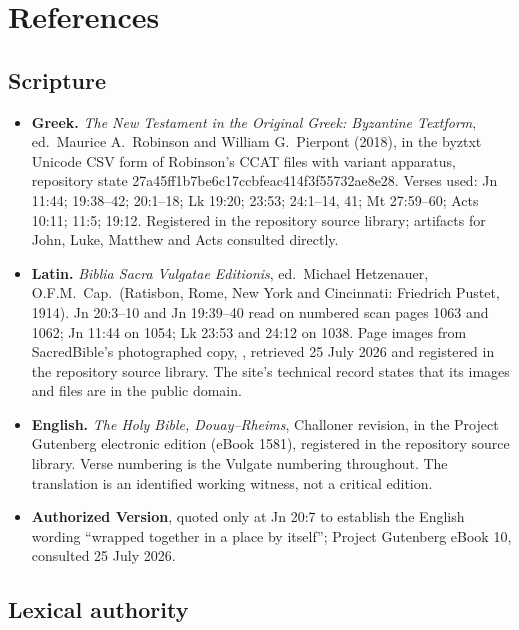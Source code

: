 \section{References}

\begingroup
\sloppy

\subsection*{Scripture}

{\fontsize{8.6}{9.6}\selectfont
\begin{itemize}[itemsep=0pt,parsep=0pt,topsep=0.05em]
\item \textbf{Greek.} \emph{The New Testament in the Original Greek: Byzantine
Textform}, ed.\ Maurice A.\ Robinson and William G.\ Pierpont (2018), in the
byztxt Unicode CSV form of Robinson's CCAT files with variant apparatus,
repository state 27a45ff1b7be6c17ccbfeac414f3f55732ae8e28. Verses used: Jn
11:44; 19:38--42; 20:1--18; Lk 19:20; 23:53; 24:1--14, 41; Mt 27:59--60; Acts
10:11; 11:5; 19:12. Registered in the repository source library; artifacts for
John, Luke, Matthew and Acts consulted directly.
\item \textbf{Latin.} \emph{Biblia Sacra Vulgatae Editionis}, ed.\ Michael
Hetzenauer, O.F.M.\ Cap.\ (Ratisbon, Rome, New York and Cincinnati: Friedrich
Pustet, 1914). Jn 20:3--10 and Jn 19:39--40 read on numbered scan pages 1063 and
1062; Jn 11:44 on 1054; Lk 23:53 and 24:12 on 1038. Page images from
SacredBible's photographed copy, ,
retrieved 25 July 2026 and registered in the repository source library. The
site's technical record states that its images and files are in the public
domain.
\item \textbf{English.} \emph{The Holy Bible, Douay--Rheims}, Challoner
revision, in the Project Gutenberg electronic edition (eBook 1581), registered
in the repository source library. Verse numbering is the Vulgate numbering
throughout. The translation is an identified working witness, not a critical
edition.
\item \textbf{Authorized Version}, quoted only at Jn 20:7 to establish the
English wording ``wrapped together in a place by itself''; Project Gutenberg
eBook 10, consulted 25 July 2026.
\end{itemize}}

\subsection*{Lexical authority}

